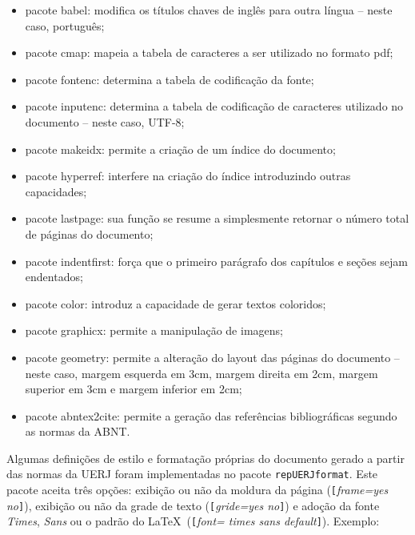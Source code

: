\documentclass[a4paper,12pt,oneside,onecolumn]{article}
\newcommand{\opcoes}[1]{\texttt{[}\textsl{#1}\texttt{]}}
\begin{document}
\begin{itemize}
  \item pacote babel: modifica os títulos chaves de inglês para outra língua -- neste caso, português;
  \item pacote cmap: mapeia a tabela de caracteres a ser utilizado no formato pdf;
  \item pacote fontenc: determina a tabela de codificação da fonte;
  \item pacote inputenc: determina a tabela de codificação de caracteres utilizado no documento -- neste caso, UTF-8;
  \item pacote makeidx: permite a criação de um índice do documento;
  \item pacote hyperref: interfere na criação do índice introduzindo outras capacidades;
  \item pacote lastpage: sua função se resume a simplesmente retornar o número total de páginas do documento;
  \item pacote indentfirst: força que o primeiro parágrafo dos capítulos e seções sejam endentados;
  \item pacote color: introduz a capacidade de gerar textos coloridos;
  \item pacote graphicx: permite a manipulação de imagens;
  \item pacote geometry: permite a alteração do layout das páginas do documento -- neste caso, margem esquerda em 3cm, margem direita em 2cm, margem superior em 3cm e margem inferior em 2cm;
  \item pacote abntex2cite: permite a geração das referências bibliográficas segundo as normas da ABNT.\\
\end{itemize}

Algumas definições de estilo e formatação próprias do documento gerado a partir das normas da UERJ foram implementadas no pacote \texttt{repUERJformat}. Este pacote aceita três opções: exibição ou não da moldura da página (\opcoes{frame=yes \textbar no}), exibição ou não da grade de texto (\opcoes{gride=yes \textbar no}) e adoção da fonte \emph{Times}, \emph{Sans} ou o padrão do \LaTeX\ (\opcoes{font= times \textbar sans \textbar default}). Exemplo:\\
\end{document}

